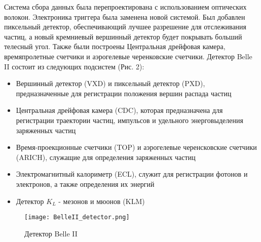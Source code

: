   Система сбора данных была перепроектирована с использованием оптических волокон. Электроника триггера была заменена новой системой. Был добавлен пиксельный детектор, обеспечивающий лучшее разрешение для отслеживания частиц, а новый кремниевый вершинный детектор будет покрывать больший телесный угол. Также были построены Центральная дрейфовая камера, времяпролетные счетчики и аэрогелевые черенковские счетчики. Детектор Belle II состоит из следующих подсистем (Рис. 2):
\begin{itemize}
  \item Вершинный детектор (VXD) и пиксельный детектор (PXD), предназначенные для регистрации положения вершин распада частиц
  \item Центральная дрейфовая камера (CDC), которая предназначена для регистрации траектории частиц, импульсов и удельного энерговыделения заряженных частиц
  \item Время-проекционные счетчики (TOP) и аэрогелевые черенсковские счетчики (ARICH), служащие для определения заряженных частиц
  \item Электромагнитный калориметр (ECL), служит для регистрации фотонов и электронов, а также определения их энергий
  \item Детектор $K_{L}$ - мезонов и мюонов (KLM)
\end{itemize}
\begin{figure}[htp]
  \centering
  \texttt{[image: BelleII\_detector.png]}
  \caption{Детектор Belle II}
  \label{fig:galaxy}
\end{figure}
